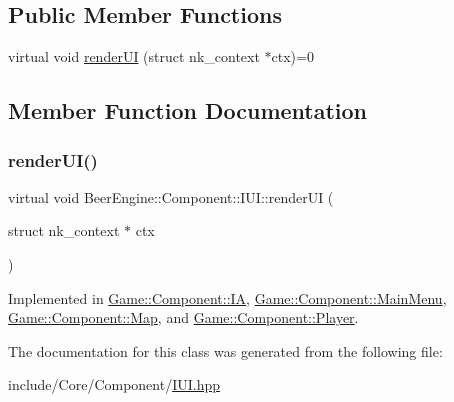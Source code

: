 \subsection*{Public Member Functions}
\begin{DoxyCompactItemize}
\item 
virtual void \mbox{\hyperlink{class_beer_engine_1_1_component_1_1_i_u_i_a4a049b1749c1bce80e1fd63538e9fae3}{render\+UI}} (struct nk\+\_\+context $\ast$ctx)=0
\end{DoxyCompactItemize}


\subsection{Member Function Documentation}
\mbox{\label{class_beer_engine_1_1_component_1_1_i_u_i_a4a049b1749c1bce80e1fd63538e9fae3}} 
\subsubsection{\texorpdfstring{render\+U\+I()}{renderUI()}}
{\footnotesize\ttfamily virtual void Beer\+Engine\+::\+Component\+::\+I\+U\+I\+::render\+UI (\begin{DoxyParamCaption}\item[{struct nk\+\_\+context $\ast$}]{ctx }\end{DoxyParamCaption})\hspace{0.3cm}{\ttfamily [pure virtual]}}



Implemented in \mbox{\hyperlink{class_game_1_1_component_1_1_i_a_a50991daa660054341c1f339611226c02}{Game\+::\+Component\+::\+IA}}, \mbox{\hyperlink{class_game_1_1_component_1_1_main_menu_a36f876bbeca9056e17c6d13b82fc3364}{Game\+::\+Component\+::\+Main\+Menu}}, \mbox{\hyperlink{class_game_1_1_component_1_1_map_af062dd2c3e677c1d3d9204cac8508dde}{Game\+::\+Component\+::\+Map}}, and \mbox{\hyperlink{class_game_1_1_component_1_1_player_a5d5f837406a8e9f62dbe2c83ab3751b6}{Game\+::\+Component\+::\+Player}}.



The documentation for this class was generated from the following file\+:\begin{DoxyCompactItemize}
\item 
include/\+Core/\+Component/\mbox{\hyperlink{_i_u_i_8hpp}{I\+U\+I.\+hpp}}\end{DoxyCompactItemize}
